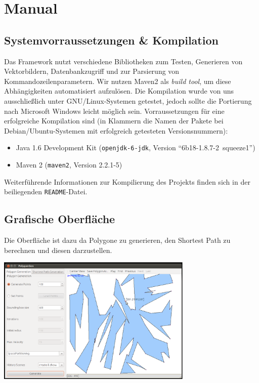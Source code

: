 \section{Manual}
\label{sec:manual}
\subsection{Systemvorraussetzungen \& Kompilation}
Das Framework nutzt verschiedene Bibliotheken zum Testen, Generieren von Vektorbildern, Datenbankzugriff und zur Parsierung von Kommandozeilenparametern. Wir nutzen Maven2 als \emph{build tool}, um diese Abhängigkeiten automatisiert aufzulösen. Die Kompilation wurde von uns ausschließlich unter GNU/Linux-Systemen getestet, jedoch sollte die Portierung nach Microsoft Windows leicht möglich sein. Vorraussetzungen für eine erfolgreiche Kompilation sind (in Klammern die Namen der Pakete bei Debian/Ubuntu-Systemen mit erfolgreich getesteten Versionsnummern):
\begin{itemize}
	\item Java 1.6 Development Kit (\texttt{openjdk-6-jdk}, Version \enquote{6b18-1.8.7-2~squeeze1})
	\item Maven 2 (\texttt{maven2}, Version 2.2.1-5)
\end{itemize}

Weiterführende Informationen zur Kompilierung des Projekts finden sich in der beiliegenden \texttt{README}-Datei.

\subsection{Grafische Oberfläche}
Die Oberfläche ist dazu da Polygone zu generieren, den Shortest Path zu berechnen und diesen darzustellen.\\
\begin{center}
\includegraphics[width=0.7\textwidth]{img/GUI.eps}
\end{center}

